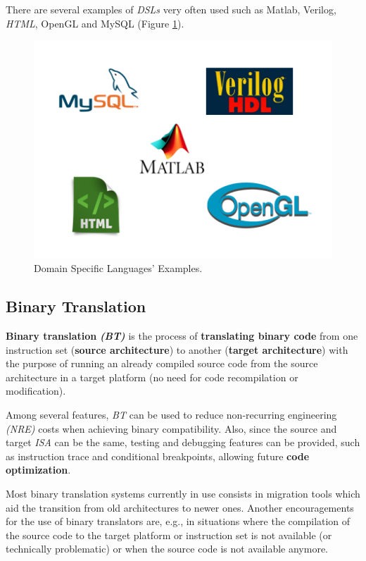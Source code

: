 \documentclass[12pt]{article}
\begin{document}
{There are several examples of \textit{DSLs} very often used such as Matlab, Verilog, \textit{HTML}, OpenGL and MySQL (Figure \ref{fig:A_DSLexamples}).

\begin{figure}[!htb]
\centering
\includegraphics[scale=0.7]{images/A_DSLexamples}
\caption{Domain Specific Languages' Examples.}
\label{fig:A_DSLexamples} 
\end{figure}


\subsection{Binary Translation}\textit{}
\textbf{Binary translation} \textbf{\textit{(BT)}} is the process of \textbf{translating binary code} from one instruction set (\textbf{source architecture}) to another (\textbf{target architecture}) with the purpose of running an already compiled source code from the source architecture in a target platform (no need for code recompilation or modification). \cite{BinaryTranslation} 

Among several features, \textit{BT} can be used to reduce non-recurring engineering \textit{(NRE)} costs when achieving binary compatibility. \cite{DBT1}
Also, since the source and target \textit{ISA} can be the same, testing and debugging features can be provided, such as instruction trace and conditional breakpoints, allowing future \textbf{code optimization}. \cite{DBT1}

Most binary translation systems currently in use consists in migration tools which aid the transition from old architectures to newer ones. \cite{BinaryTranslation} Another encouragements for the use of binary translators are, e.g., in situations where the compilation of the source code to the target platform or instruction set is not available (or technically problematic) or when the source code is not available anymore. 

}
\end{document}
